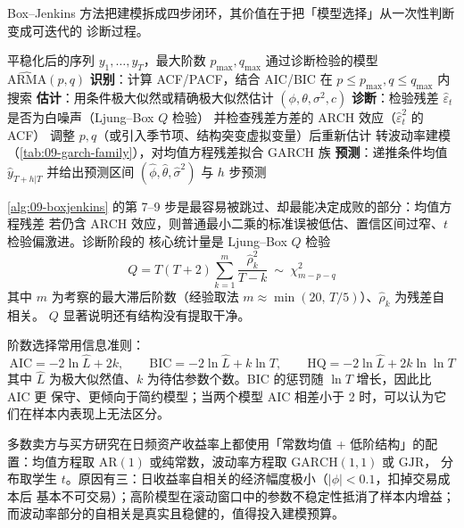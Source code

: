 Box--Jenkins 方法把建模拆成四步闭环，其价值在于把「模型选择」从一次性判断变成可迭代的
诊断过程。

\begin{algorithm}[htbp]
\caption{Box--Jenkins 四步建模流程}\label{alg:09-boxjenkins}
\begin{algorithmic}[1]
\Require 平稳化后的序列 $y_1,\dots,y_T$，最大阶数 $p_{\max},q_{\max}$
\Ensure 通过诊断检验的模型 $\widehat{\mathrm{ARMA}}(p,q)$
\State \textbf{识别}：计算 ACF/PACF，结合 AIC/BIC 在 $p\le p_{\max},q\le q_{\max}$ 内搜索
\State \textbf{估计}：用条件极大似然或精确极大似然估计 $(\phi,\theta,\sigma^2,c)$
  \State \textbf{诊断}：检验残差 $\hat\varepsilon_t$ 是否为白噪声（Ljung--Box $Q$ 检验）
  \State \hspace{2em}并检查残差方差的 ARCH 效应（$\hat\varepsilon_t^2$ 的 ACF）
    \State 调整 $p,q$（或引入季节项、结构突变虚拟变量）后重新估计
    \State 转波动率建模（\cref{tab:09-garch-family}），对均值方程残差拟合 GARCH 族
  \EndIf
\EndWhile
\State \textbf{预测}：递推条件均值 $\hat{y}_{T+h|T}$ 并给出预测区间
\State \Return $(\hat\phi,\hat\theta,\hat\sigma^2)$ 与 $h$ 步预测
\end{algorithmic}
\end{algorithm}

\cref{alg:09-boxjenkins} 的第 7--9 步是最容易被跳过、却最能决定成败的部分：均值方程残差
若仍含 ARCH 效应，则普通最小二乘的标准误被低估、置信区间过窄、$t$ 检验偏激进。诊断阶段的
核心统计量是 Ljung--Box $Q$ 检验
\begin{equation}\label{eq:09-ljungbox}
  Q=T(T+2)\sum_{k=1}^{m}\frac{\hat\rho_k^{2}}{T-k}\ \sim\ \chi^{2}_{m-p-q}
\end{equation}
其中 $m$ 为考察的最大滞后阶数（经验取法 $m\approx\min(20,\,T/5)$）、$\hat\rho_k$ 为残差自相关。
$Q$ 显著说明还有结构没有提取干净。

阶数选择常用信息准则：
\begin{equation}\label{eq:09-ic}
  \mathrm{AIC}=-2\ln \hat{L}+2k,\qquad
  \mathrm{BIC}=-2\ln \hat{L}+k\ln T,\qquad
  \mathrm{HQ}=-2\ln \hat{L}+2k\ln\ln T
\end{equation}
其中 $\hat L$ 为极大似然值、$k$ 为待估参数个数。BIC 的惩罚随 $\ln T$ 增长，因此比 AIC 更
保守、更倾向于简约模型；当两个模型 AIC 相差小于 2 时，可以认为它们在样本内表现上无法区分。

\begin{appbox}[实务中的默认配置]
多数卖方与买方研究在日频资产收益率上都使用「常数均值 + 低阶结构」的配置：均值方程取
$\mathrm{AR}(1)$ 或纯常数，波动率方程取 $\mathrm{GARCH}(1,1)$ 或 $\mathrm{GJR}$，
分布取学生 $t$。原因有三：日收益率自相关的经济幅度极小（$|\phi|<0.1$，扣掉交易成本后
基本不可交易）；高阶模型在滚动窗口中的参数不稳定性抵消了样本内增益；
而波动率部分的自相关是真实且稳健的，值得投入建模预算。
\end{appbox}

